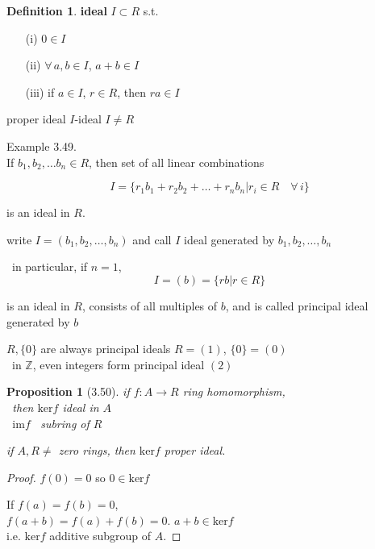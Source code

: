 \documentclass[twoside,landscape]{amsart}
\theoremstyle{plain}
\newtheorem{proposition}{Proposition}
\theoremstyle{definition}
\newtheorem{definition}{Definition}
\theoremstyle{remark}
\begin{document}
\begin{multicols*}{2}
\begin{enumerate}
\end{enumerate}



\begin{definition} \textbf{ideal} $I \subset R$ s.t. 
\begin{enumerate}
\item[(i)] $0 \in I$ 
\item[(ii)] $\forall \, a,b \in I$, $a+b \in I$
\item[(iii)] if $a\in I$, $r \in R$, then $ra \in I$
\end{enumerate}
proper ideal $I$-ideal $I\neq R$
\end{definition}


Example 3.49.  \\

If $b_1, b_2, \dots b_n \in R$, then set of all linear combinations

\[
I = \lbrace r_1 b_1 + r_2 b_2 + \dots + r_n b_n | r_i \in R \quad \forall \, i \rbrace
\]

is an ideal in $R$.  

write $I = (b_1, b_2, \dots , b_n)$ and call $I$ ideal generated by $b_1, b_2, \dots , b_n$

\, in particular, if $n=1$, 
\[
I = (b) = \lbrace rb | r \in R \rbrace
\]

is an ideal in $R$, consists of all multiples of $b$, and is called principal ideal generated by $b$ 

$R, \lbrace 0 \rbrace$ are always principal ideals $R=(1)$, $\lbrace 0 \rbrace = (0)$ \\
\, in $\mathbb{Z}$, even integers form principal ideal $(2)$



\begin{proposition}[3.50]
  if $f:A \to R$ ring homomorphism, \\
\, then $\text{ker}{f}$ ideal in $A$ \\
\, \phantom{then } $\text{im}{f}$ \, subring of $R$ 

if $A,R \neq $ zero rings, then $\text{ker}{f}$ proper ideal.  
\end{proposition}

\begin{proof}
$f(0) = 0$ so $0 \in \text{ker}{f}$

If $f(a) = f(b) =0 $, \\
$f(a+b) = f(a) + f(b) = 0$.  $a+b \in \text{ker}{f}$ \\
i.e. $\text{ker}{f}$ additive subgroup of $A$.  


\end{proof}
\end{multicols*}
\end{document}
